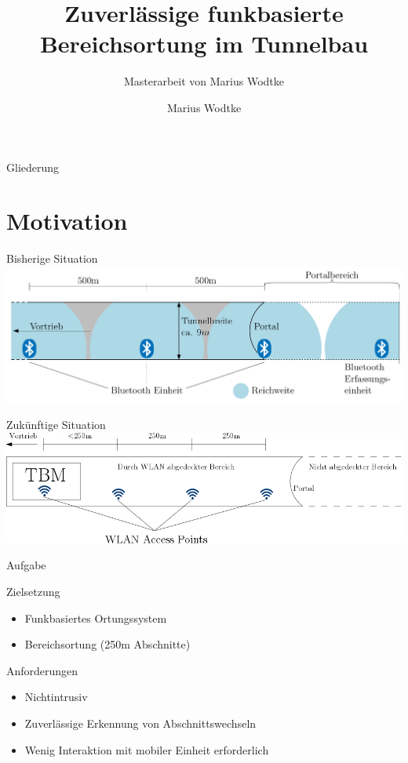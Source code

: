 \documentclass[18pt]{beamer}
\title[Funkbasierte Bereichsortung]{Zuverlässige funkbasierte
Bereichsortung im Tunnelbau}
\subtitle{Masterarbeit von Marius Wodtke}
\author{Marius Wodtke}
\institute{Instuitut für angewandte Informatik und Formale Beschreibungsverfahren}
\begin{document}

\begin{frame}
\titlepage
\end{frame}

\begin{frame}{Gliederung}
	\tableofcontents
\end{frame}

\section{Motivation}
\begin{frame}{Bisherige Situation}
	\includegraphics[width=\textwidth]{images/bisherige.png}\\
	\cite{maurer2016unterstuetzung}
\end{frame}

\begin{frame}{Zukünftige Situation}
	\includegraphics[width=\textwidth]{images/zukuenftige.png}
\end{frame}

\begin{frame}{Aufgabe}
	\begin{block}{Zielsetzung}
		\begin{itemize}
			\item Funkbasiertes Ortungssystem
			\item Bereichsortung (250m Abschnitte)
		\end{itemize}
	\end{block}


	\begin{block}{Anforderungen}
		\begin{itemize}
			\item Nichtintrusiv 
			\item Zuverlässige Erkennung von Abschnittswechseln
			\item Wenig Interaktion mit mobiler Einheit erforderlich
		\end{itemize}
	\end{block}
\end{frame}
\end{document}
